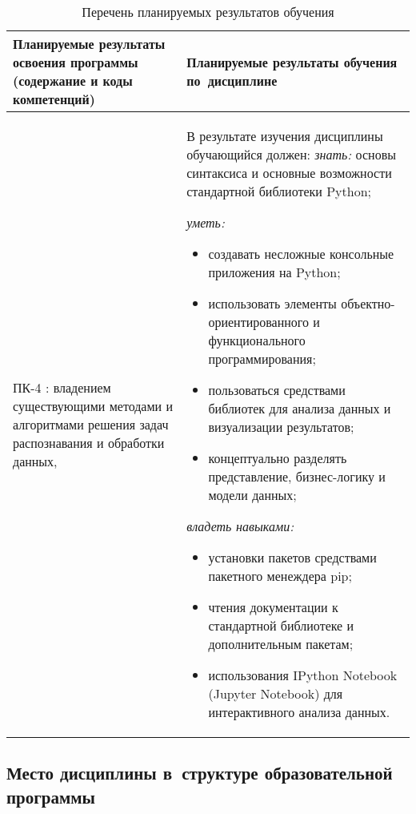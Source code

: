 \documentclass[a4paper,12pt]{article}
\begin{document}
\begin{longtable}{|p{45mm}|p{109mm}|}
  \caption{Перечень планируемых результатов обучения}\\
  \hline
  \centering
  Планируемые результаты освоения программы (содержание и коды компетенций) & 
  \centering\arraybackslash
  Планируемые результаты обучения по~дисциплине
  \\
  \hline
  
  ПК-4 : владением существующими методами и алгоритмами решения задач распознавания и обработки данных, 
  
  & 
  В результате изучения дисциплины обучающийся должен:\newline
  \emph{знать:}
  основы синтаксиса и основные возможности стандартной библиотеки Python;
  

  \emph{уметь:}
  \begin{itemize}[leftmargin=12pt]
    \item создавать несложные консольные приложения на Python; 
    \item использовать элементы объект\-но-ориен\-ти\-ро\-ван\-но\-го и функционального программирования; 
    \item пользоваться средствами библиотек для анализа данных и визуализации результатов; 
    \item концептуально разделять представление, бизнес-логику и модели данных; 
  \end{itemize}
  

  \emph{владеть навыками:}
  \begin{itemize}[leftmargin=12pt]
    \item установки пакетов средствами пакетного менеждера pip; 
    \item чтения документации к стандартной библиотеке и дополнительным пакетам; 
    \item использования IPython Notebook (Jupyter Notebook) для интерактивного анализа данных. 
  \end{itemize}
  
  \\
  \hline
  \end{longtable}


\subsection{Место дисциплины в~структуре образовательной программы}
\end{document}
